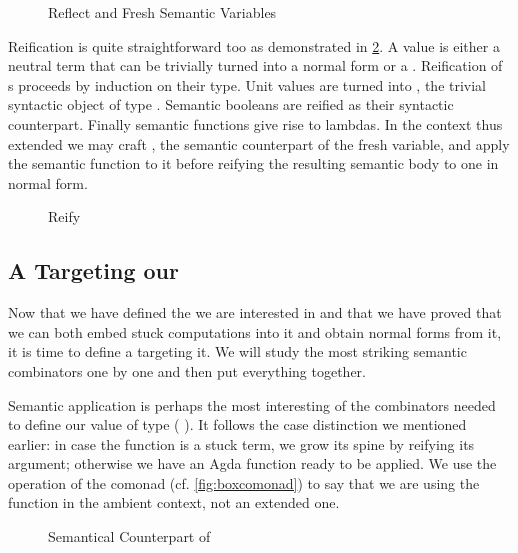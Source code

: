 \begin{figure}[h]
\caption{Reflect and Fresh Semantic Variables}\label{fig:bix:reflect}
\end{figure}

Reification is quite straightforward too as demonstrated in \cref{fig:bix:reify}.
A  value is
either a neutral term that can be trivially turned into a normal
form or a . Reification of s proceeds by induction
on their type. Unit values are turned into , the trivial
syntactic object of type . Semantic booleans are reified
as their syntactic counterpart. Finally semantic functions give rise
to lambdas. In the context thus extended we may craft , the
semantic counterpart of the fresh variable, and apply the semantic
function to it before reifying the resulting semantic body to one in
normal form.

\begin{figure}[h]
\caption{Reify}\label{fig:bix:reify}
\end{figure}

\subsection{A  Targeting our }

Now that we have defined the  we are interested in and that
we have proved that we can both embed stuck computations into it and
obtain normal forms from it, it is time to define a 
targeting it. We will study the most striking semantic combinators
one by one and then put everything together.

Semantic application is perhaps the most interesting of the combinators
needed to define our value of type (  ).
It follows the case distinction we mentioned earlier: in case the function
is a stuck term, we grow its spine by reifying its argument; otherwise we
have an Agda function ready to be applied. We use the  operation
of the  comonad (cf. \cref{fig:boxcomonad}) to say that we are using
the function in the ambient context, not an extended one.

\begin{figure}[h]
\caption{Semantical Counterpart of }
\end{figure}

